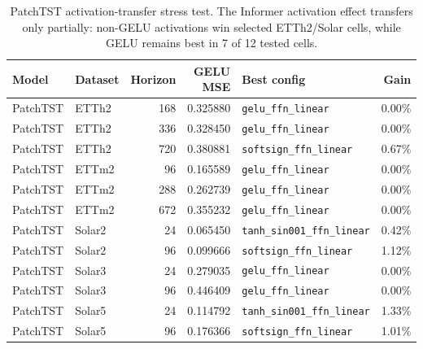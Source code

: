 \begin{table}[t]
\centering
\caption{PatchTST activation-transfer stress test. The Informer activation effect transfers only partially: non-GELU activations win selected ETTh2/Solar cells, while GELU remains best in 7 of 12 tested cells.}
\label{tab:patchtst_transfer}
\begin{tabular}{llrrlr}
\toprule
Model & Dataset & Horizon & GELU MSE & Best config & Gain \\
\midrule
PatchTST & ETTh2 & 168 & 0.325880 & \texttt{gelu\_ffn\_linear} & 0.00\% \\
PatchTST & ETTh2 & 336 & 0.328450 & \texttt{gelu\_ffn\_linear} & 0.00\% \\
PatchTST & ETTh2 & 720 & 0.380881 & \texttt{softsign\_ffn\_linear} & 0.67\% \\
PatchTST & ETTm2 & 96 & 0.165589 & \texttt{gelu\_ffn\_linear} & 0.00\% \\
PatchTST & ETTm2 & 288 & 0.262739 & \texttt{gelu\_ffn\_linear} & 0.00\% \\
PatchTST & ETTm2 & 672 & 0.355232 & \texttt{gelu\_ffn\_linear} & 0.00\% \\
PatchTST & Solar2 & 24 & 0.065450 & \texttt{tanh\_sin001\_ffn\_linear} & 0.42\% \\
PatchTST & Solar2 & 96 & 0.099666 & \texttt{softsign\_ffn\_linear} & 1.12\% \\
PatchTST & Solar3 & 24 & 0.279035 & \texttt{gelu\_ffn\_linear} & 0.00\% \\
PatchTST & Solar3 & 96 & 0.446409 & \texttt{gelu\_ffn\_linear} & 0.00\% \\
PatchTST & Solar5 & 24 & 0.114792 & \texttt{tanh\_sin001\_ffn\_linear} & 1.33\% \\
PatchTST & Solar5 & 96 & 0.176366 & \texttt{softsign\_ffn\_linear} & 1.01\% \\
\bottomrule
\end{tabular}
\end{table}
